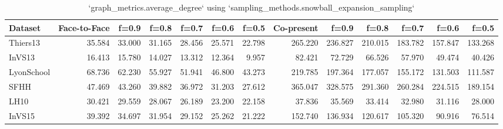 \begin{table}[ht]
\begin{tabular}{lrrrrrrrrrrrr}
\hline
 Dataset    &   Face-to-Face &   f=0.9 &   f=0.8 &   f=0.7 &   f=0.6 &   f=0.5 &   Co-present &   f=0.9 &   f=0.8 &   f=0.7 &   f=0.6 &   f=0.5 \\
\hline
 Thiers13   &         35.584 &  33.000 &  31.165 &  28.456 &  25.571 &  22.798 &      265.220 & 236.827 & 210.015 & 183.782 & 157.847 & 133.268 \\
 InVS13     &         16.413 &  15.780 &  14.027 &  13.312 &  12.364 &   9.957 &       82.421 &  72.729 &  66.526 &  57.970 &  49.474 &  40.426 \\
 LyonSchool &         68.736 &  62.230 &  55.927 &  51.941 &  46.800 &  43.273 &      219.785 & 197.364 & 177.057 & 155.172 & 131.503 & 111.587 \\
 SFHH       &         47.469 &  43.260 &  39.882 &  36.972 &  31.203 &  27.612 &      365.047 & 328.575 & 291.360 & 260.284 & 224.515 & 189.154 \\
 LH10       &         30.421 &  29.559 &  28.067 &  26.189 &  23.200 &  22.158 &       37.836 &  35.569 &  33.414 &  32.980 &  31.116 &  28.000 \\
 InVS15     &         39.392 &  34.697 &  31.954 &  29.152 &  25.262 &  21.222 &      152.740 & 136.934 & 120.617 & 105.320 &  90.916 &  76.514 \\
\hline
\end{tabular}
\caption{`graph_metrics.average_degree` using `sampling_methods.snowball_expansion_sampling`}
\end{table}